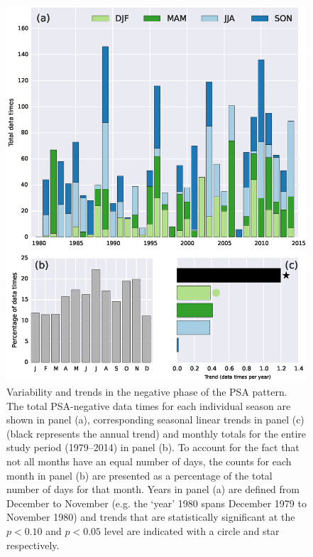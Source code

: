 \begin{figure}
\begin{center}
\includegraphics[width=0.9\columnwidth]{figures/psa/Figure4-7.eps}
\caption[Variability and trends in the negative phase of the PSA pattern]{\label{fig:psa-neg_seasonality}
Variability and trends in the negative phase of the PSA pattern. The total PSA-negative data times for each individual season are shown in panel (a), corresponding seasonal linear trends in panel (c) (black represents the annual trend) and monthly totals for the entire study period (1979--2014) in panel (b). To account for the fact that not all months have an equal number of days, the counts for each month in panel (b) are presented as a percentage of the total number of days for that month. Years in panel (a) are defined from December to November (e.g. the `year' 1980 spans December 1979 to November 1980) and trends that are statistically significant at the $p < 0.10$ and $p < 0.05$ level are indicated with a circle and star respectively.%
}
\end{center}
\end{figure}

